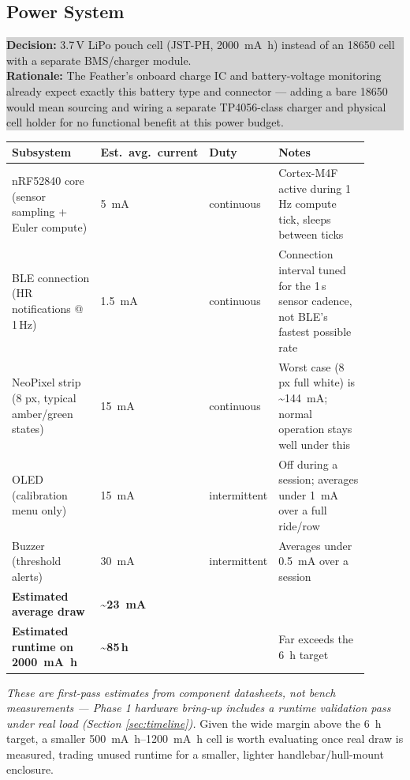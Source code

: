 \documentclass[11pt, letterpaper]{article}
\newcommand{\decision}[2]{%
  \par\vspace{0.4em}
  \noindent\colorbox{lightgray}{\parbox{0.97\linewidth}{\vspace{0.3em}
  \textbf{\color{trinityblue} Decision:} #1 \\[0.3em]
  \textbf{Rationale:} #2
  \vspace{0.3em}}}%
  \par\vspace{0.4em}
}
\begin{document}
\subsection{Power System}
\label{sec:power}

\decision{3.7\,V LiPo pouch cell (JST-PH, \SI{2000}{\milli\ampere\hour}) instead of an 18650 cell
with a separate BMS/charger module.}
{The Feather's onboard charge IC and battery-voltage monitoring already expect exactly this
battery type and connector --- adding a bare 18650 would mean sourcing and wiring a separate
TP4056-class charger and physical cell holder for no functional benefit at this power budget.}

\begin{center}
\small
\begin{longtable}{p{0.30\linewidth}p{0.14\linewidth}p{0.10\linewidth}p{0.36\linewidth}}
\toprule
\textbf{Subsystem} & \textbf{Est.\ avg.\ current} & \textbf{Duty} & \textbf{Notes} \\
\midrule
nRF52840 core (sensor sampling + Euler compute) & \SI{5}{\milli\ampere} & continuous & Cortex-M4F
active during 1\,Hz compute tick, sleeps between ticks \\
BLE connection (HR notifications @ 1\,Hz) & \SI{1.5}{\milli\ampere} & continuous & Connection
interval tuned for the 1\,s sensor cadence, not BLE's fastest possible rate \\
NeoPixel strip (8 px, typical amber/green states) & \SI{15}{\milli\ampere} & continuous &
Worst case (8 px full white) is \textasciitilde\SI{144}{\milli\ampere}; normal operation stays
well under this \\
OLED (calibration menu only) & \SI{15}{\milli\ampere} & intermittent & Off during a session;
averages under \SI{1}{\milli\ampere} over a full ride/row \\
Buzzer (threshold alerts) & \SI{30}{\milli\ampere} & intermittent & Averages under
\SI{0.5}{\milli\ampere} over a session \\
\midrule
\textbf{Estimated average draw} & \textbf{\textasciitilde\SI{23}{\milli\ampere}} & & \\
\textbf{Estimated runtime on \SI{2000}{\milli\ampere\hour}} & \textbf{\textasciitilde 85\,h} & &
Far exceeds the \SI{6}{\hour} target \\
\bottomrule
\end{longtable}
\end{center}

\textit{These are first-pass estimates from component datasheets, not bench measurements ---
Phase 1 hardware bring-up includes a runtime validation pass under real load (Section
\ref{sec:timeline}).} Given the wide margin above the \SI{6}{\hour} target, a smaller
\SI{500}{\milli\ampere\hour}--\SI{1200}{\milli\ampere\hour} cell is worth evaluating once real
draw is measured, trading unused runtime for a smaller, lighter handlebar/hull-mount enclosure.
\end{document}
